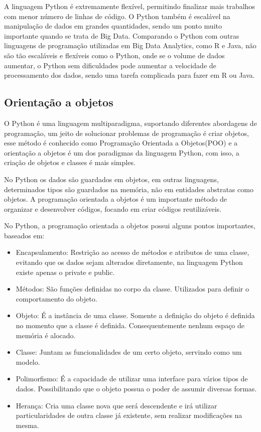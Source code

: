         A linguagem Python é extremamente flexível, permitindo finalizar mais trabalhos com menor número de linhas de código. O Python também é escalável na manipulação de dados em grandes quantidades, sendo um ponto muito importante quando se trata de Big Data. Comparando o Python com outras linguagens de programação utilizadas em Big Data Analytics, como R e Java, não são tão escaláveis e flexíveis como o Python, onde se o volume de dados aumentar, o Python sem dificuldades pode aumentar a velocidade de processamento dos dados, sendo uma tarefa complicada para fazer em R ou Java. \cite{McKinney2019}

        \subsection{Orientação a objetos}  
        O Python é uma linguagem multiparadigma, suportando diferentes abordagens de programação, um jeito de solucionar problemas de programação é criar objetos, esse método é conhecido como Programação Orientada a Objetos(POO) e a orientação a objetos é um dos paradigmas da linguagem Python, com isso, a criação de objetos e classes é mais simples. 
        
        No Python os dados são guardados em objetos, em outras linguagens, determinados tipos são guardados na memória, não em entidades abstratas como objetos. A programação orientada a objetos é um importante método de organizar e desenvolver códigos, focando em criar códigos reutilizáveis. \cite{Lutz2007}
        
        No Python, a programação orientada a objetos possui alguns pontos importantes, baseados em: \cite{Lutz2007} 
        \begin{itemize}
        	\item Encapsulamento: Restrição ao acesso de métodos e atributos de uma classe, evitando que os dados sejam alterados diretamente, na linguagem Python existe apenas o private e public.
        	
        	\item Métodos: São funções definidas no corpo da classe. Utilizados para definir o comportamento do objeto. 
        	
        	\item Objeto: É a instância de uma classe. Somente a definição do objeto é definida no momento que a classe é definida.  Consequentemente nenhum espaço de memória é alocado.
        	
        	\item Classe: Juntam as funcionalidades de um certo objeto, servindo como um modelo.
        	
        	\item Polimorfismo: É a capacidade de utilizar uma interface para vários tipos de dados. Possibilitando que o objeto possua o poder de assumir diversas formas. 
        	
        	\item Herança: Cria uma classe nova que será descendente e irá utilizar particularidades de outra classe já existente, sem realizar modificações na mesma.
        	 
        	
        \end{itemize}


